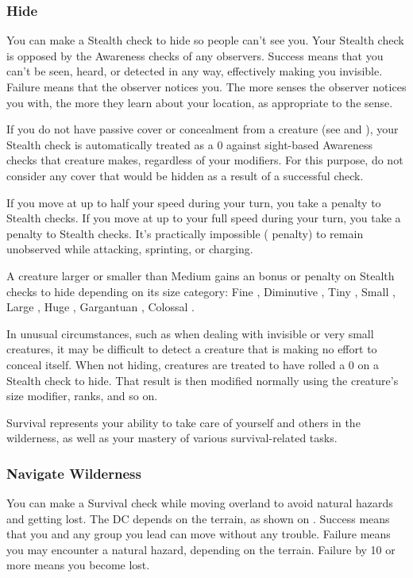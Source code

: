 \subsubsection{Hide}
You can make a Stealth check to hide so people can't see you. Your Stealth check is opposed by the Awareness checks of any observers. Success means that you can't be seen, heard, or detected in any way, effectively making you invisible. Failure means that the observer notices you. The more senses the observer notices you with, the more they learn about your location, as appropriate to the sense. 

If you do not have passive cover or concealment from a creature (see  and ), your Stealth check is automatically treated as a 0 against sight-based Awareness checks that creature makes, regardless of your modifiers. For this purpose, do not consider any cover that would be hidden as a result of a successful check.

If you move at up to half your speed during your turn, you take a  penalty to Stealth checks. If you move at up to your full speed during your turn, you take a  penalty to Stealth checks. It's practically impossible ( penalty) to remain unobserved while attacking, sprinting, or charging.

A creature larger or smaller than Medium gains an bonus or penalty on Stealth checks to hide depending on its size category: Fine , Diminutive , Tiny , Small , Large , Huge , Gargantuan , Colossal .

 In unusual circumstances, such as when dealing with invisible or very small creatures, it may be difficult to detect a creature that is making no effort to conceal itself. When not hiding, creatures are treated to have rolled a 0 on a Stealth check to hide. That result is then modified normally using the creature's size modifier, ranks, and so on.

Survival represents your ability to take care of yourself and others in the wilderness, as well as your mastery of various survival-related tasks. 

\subsubsection{Navigate Wilderness}
You can make a Survival check while moving overland to avoid natural hazards and getting lost. The DC depends on the terrain, as shown on . Success means that you and any group you lead can move without any trouble. Failure means you may encounter a natural hazard, depending on the terrain. Failure by 10 or more means you become lost.

